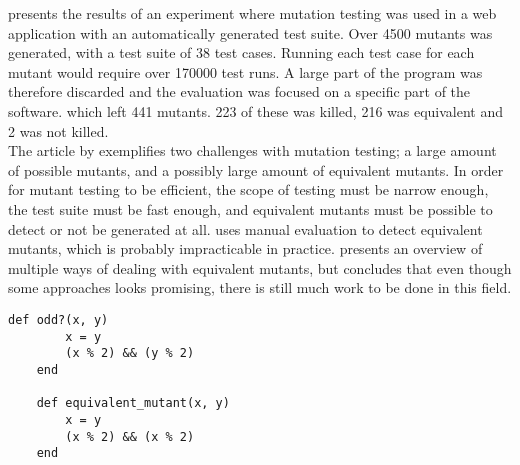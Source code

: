 \citet{article:mutation} presents the results of an experiment where
mutation testing was used in a web application with an automatically
generated test suite. Over 4500 mutants was generated, with a test suite
of 38 test cases. Running each test case for each mutant would require
over 170000 test runs. A large part of the program was therefore
discarded and the evaluation was focused on a specific part of the
software. which left 441 mutants. 223 of these was killed, 216 was
equivalent and 2 was not killed.\\

The article by \citeauthor{article:mutation} exemplifies two challenges
with mutation testing; a large amount of possible mutants, and a
possibly large amount of equivalent mutants. In order for mutant testing
to be efficient, the scope of testing must be narrow enough, the test
suite must be fast enough, and equivalent mutants must be possible to
detect or not be generated at all. \citeauthor{article:mutation} uses
manual evaluation to detect equivalent mutants, which is probably
impracticable in practice. \citet{article:eq_mutant} presents an
overview of multiple ways of dealing with equivalent mutants, but
concludes that even though some approaches looks promising, there is
still much work to be done in this field.\\

\begin{lstlisting}[caption=Example of a program with an equivalent mutant,
                   label=lst:mutation_eq, float=t]
    def odd?(x, y)
        x = y
        (x % 2) && (y % 2)
    end

    def equivalent_mutant(x, y)
        x = y
        (x % 2) && (x % 2)
    end
\end{lstlisting}
